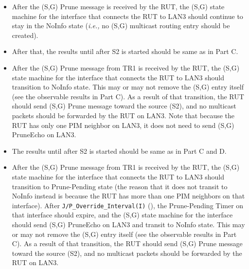 \documentclass[11pt]{report}
\newcommand{\ie}{\emph{i.e.,}\xspace}
\begin{document}
\begin{itemize}

  \item After the (S,G) Prune message is received by the RUT,
  the (S,G) state machine for the interface that connects the RUT to
  LAN3 should continue to stay in the NoInfo state (\ie no (S,G) multicast
  routing entry should be created).

  \item After that, the results until after S2 is started should be same as in
  Part C.

  \item After the (S,G) Prune message from TR1 is received by the RUT,
  the (S,G) state machine for the interface that connects the RUT to
  LAN3 should transition to NoInfo state. This may or may not remove
  the (S,G) entry itself (see the observable results in Part C).
  As a result of that transition, the RUT should send (S,G) Prune
  message toward the source (S2), and no multicast packets should be
  forwarded by the RUT on LAN3. Note that because the RUT has only one
  PIM neighbor on LAN3, it does not need to send (S,G) PruneEcho on
  LAN3.

\end{itemize}


\begin{itemize}

  \item The results until after S2 is started should be same as in
  Part C and D.

  \item After the (S,G) Prune message from TR1 is received by the RUT,
  the (S,G) state machine for the interface that connects the RUT to
  LAN3 should transition to Prune-Pending state (the reason that it does
  not transit to NoInfo instead is because the RUT has more than one PIM
  neighbors on that interface).
  After \verb=J/P_Override_Interval(I)= (\PimsmJPOverrideIntervalI),
  the Prune-Pending Timer on that interface should expire, and the
  (S,G) state machine for the interface should send (S,G) PruneEcho
  on LAN3 and transit to NoInfo
  state. This may or may not remove the (S,G) entry itself (see the observable
  results in Part C).
  As a result of that transition, the RUT should send (S,G) Prune
  message toward the source (S2), and no multicast packets should be
  forwarded by the RUT on LAN3.

\end{itemize}
\end{document}

